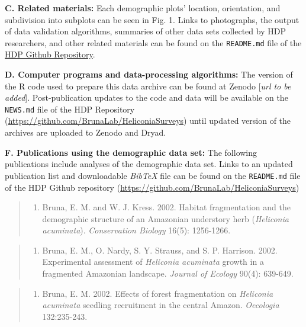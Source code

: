 \documentclass[
  man, donotrepeattitle,floatsintext]{apa6}
\providecommand{\tightlist}{%
  \setlength{\itemsep}{0pt}\setlength{\parskip}{0pt}}
\begin{document}
\noindent
\textbf{C. Related materials:} Each demographic plots' location, orientation, and subdivision into subplots can be seen in Fig. 1. Links to photographs, the output of data validation algorithms, summaries of other data sets collected by HDP researchers, and other related materials can be found on the \texttt{README.md} file of the \href{https://github.com/BrunaLab/HeliconiaSurveys}{HDP Github Repository}.

\noindent
\textbf{D. Computer programs and data-processing algorithms:} The version of the R code used to prepare this data archive can be found at Zenodo {[}\emph{url to be added}{]}. Post-publication updates to the code and data will be available on the \texttt{NEWS.md} file of the HDP Repository (\url{https://github.com/BrunaLab/HeliconiaSurveys}) until updated version of the archives are uploaded to Zenodo and Dryad.

\noindent
\textbf{F. Publications using the demographic data set:} The following publications include analyses of the demographic data set. Links to an updated publication list and downloadable \emph{BibTeX} file can be found on the \texttt{README.md} file of the HDP Github repository (\url{https://github.com/BrunaLab/HeliconiaSurveys})

\begin{quote}
\begin{enumerate}
\def\labelenumi{\arabic{enumi}.}
\tightlist
\item
  Bruna, E. M. and W. J. Kress. 2002. Habitat fragmentation and the demographic structure of an Amazonian understory herb (\emph{Heliconia acuminata}). \emph{Conservation Biology} 16(5): 1256-1266.
\end{enumerate}
\end{quote}

\begin{quote}
\begin{enumerate}
\def\labelenumi{\arabic{enumi}.}
\setcounter{enumi}{1}
\tightlist
\item
  Bruna, E. M., O. Nardy, S. Y. Strauss, and S. P. Harrison. 2002. Experimental assessment of \emph{Heliconia acuminata} growth in a fragmented Amazonian landscape. \emph{Journal of Ecology} 90(4): 639-649.
\end{enumerate}
\end{quote}

\begin{quote}
\begin{enumerate}
\def\labelenumi{\arabic{enumi}.}
\setcounter{enumi}{2}
\tightlist
\item
  Bruna, E. M. 2002. Effects of forest fragmentation on \emph{Heliconia acuminata} seedling recruitment in the central Amazon. \emph{Oecologia} 132:235-243.
\end{enumerate}
\end{quote}
\end{document}
